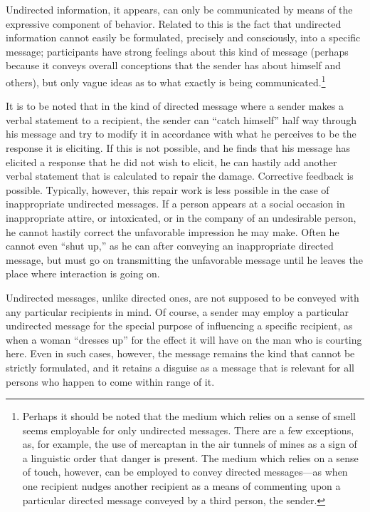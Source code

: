 \documentclass[twoside,symmetric,nobib,justified]{tufte-book}
\begin{document}
Undirected information, it appears, can only be communicated by means of
the expressive component of behavior. Related to this is the fact that
undirected information cannot easily be formulated, precisely and
consciously, into a specific message; participants have strong feelings
about this kind of message (perhaps because it conveys overall
conceptions that the sender has about himself and others), but only
vague ideas as to what exactly is being communicated.\footnote{Perhaps
  it should be noted that the medium which relies on a sense of smell
  seems employable for only undirected messages. There are a few
  exceptions, as, for example, the use of mercaptan in the air tunnels
  of mines as a sign of a linguistic order that danger is present. The
  medium which relies on a sense of touch, however, can be employed to
  convey directed messages---as when one recipient nudges another
  recipient as a means of commenting upon a particular directed message
  conveyed by a third person, the sender.}

It is to be noted that in the kind of directed message where a sender
makes a verbal statement to a recipient, the sender can ``catch
himself'' half way through his message and try to modify it in
accordance with what he perceives to be the response it is eliciting. If
this is not possible, and he finds that his message has elicited a
response that he did not wish to elicit, he can hastily add another
verbal statement that is calculated to repair the damage. Corrective
feedback is possible. Typically, however, this repair work is less
possible in the case of inappropriate undirected messages. If a person
appears at a social occasion in inappropriate attire, or intoxicated, or
in the company of an undesirable person, he cannot hastily correct the
unfavorable impression he may make. Often he cannot even ``shut up,'' as
he can after conveying an inappropriate directed message, but must go on
transmitting the unfavorable message until he leaves the place where
interaction is going on.

Undirected messages, unlike directed ones, are not supposed to be
conveyed with any particular recipients in mind. Of course, a sender may
employ a particular undirected message for the special purpose of
influencing a specific recipient, as when a woman ``dresses up'' for the
effect it will have on the man who is courting here. Even in such cases,
however, the message remains the kind that cannot be strictly
formulated, and it retains a disguise as a message that is relevant for
all persons who happen to come within range of it.
\end{document}
